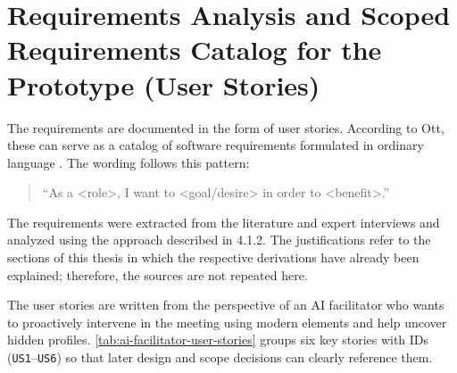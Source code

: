 \section{Requirements Analysis and Scoped Requirements Catalog for the Prototype (User Stories)}
\label{sec:requirements-analysis}

The requirements are documented in the form of user stories. According to Ott, these can serve as a catalog
of software requirements formulated in ordinary language
\cite[p.~18]{ottAppsEffektivManagen2019}. The wording follows this pattern:
\begin{quote}
  \enquote{As a <role>, I want to <goal/desire> in order to <benefit>.}
  \cite[p.~18]{ottAppsEffektivManagen2019}
\end{quote}

The requirements were extracted from the literature and expert interviews and analyzed using the approach
described in 4.1.2. The justifications refer to the sections of this thesis in which the respective
derivations have already been explained; therefore, the sources are not repeated here.

The user stories are written from the perspective of an AI facilitator who wants to proactively intervene in
the meeting using modern elements and help uncover hidden profiles. \autoref{tab:ai-facilitator-user-stories}
groups six key stories with IDs (\texttt{US1}–\texttt{US6}) so that later design and scope decisions can
clearly reference them.

\newcommand{\usid}[1]{%
  \refstepcounter{us}%
\textbf{US\theus}\label{#1}}
\newcommand{\usref}[1]{US\ref{#1}}
\newcommand{\usblocksep}{%
  \addlinespace[0.35em]
  \midrule
\addlinespace[0.55em]}


